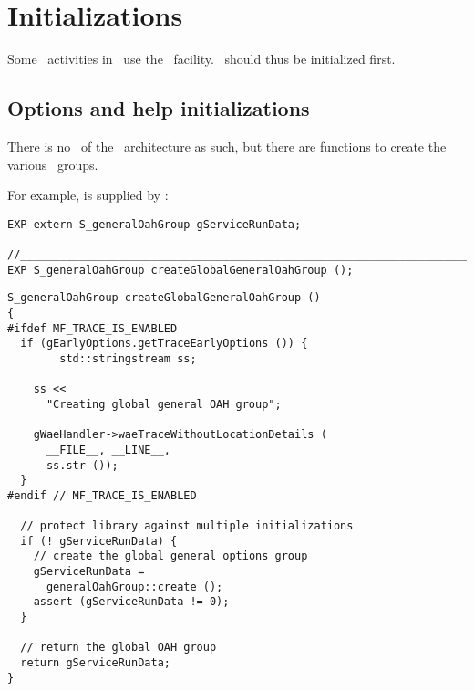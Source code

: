 



\chapter{Initializations}

Some \initialization\ activities in \mf\ use the \oahRepr\ facility. \oahRepr\ should thus be initialized first.


\section{Options and help initializations}

There is no \initialization\  of the \oahRepr\ architecture as such, but there are  functions to create the various \oahRepr\ groups.

For example,  is supplied by : %
\begin{lstlisting}[language=CPlusPlus]
EXP extern S_generalOahGroup gServiceRunData;

//______________________________________________________________________________
EXP S_generalOahGroup createGlobalGeneralOahGroup ();
\end{lstlisting}

\begin{lstlisting}[language=CPlusPlus]
S_generalOahGroup createGlobalGeneralOahGroup ()
{
#ifdef MF_TRACE_IS_ENABLED
  if (gEarlyOptions.getTraceEarlyOptions ()) {
		std::stringstream ss;

    ss <<
      "Creating global general OAH group";

    gWaeHandler->waeTraceWithoutLocationDetails (
      __FILE__, __LINE__,
      ss.str ());
  }
#endif // MF_TRACE_IS_ENABLED

  // protect library against multiple initializations
  if (! gServiceRunData) {
    // create the global general options group
    gServiceRunData =
      generalOahGroup::create ();
    assert (gServiceRunData != 0);
  }

  // return the global OAH group
  return gServiceRunData;
}
\end{lstlisting}


